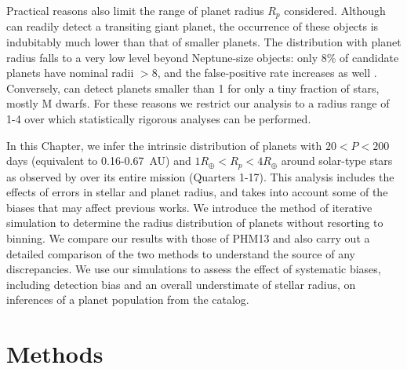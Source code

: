 Practical reasons also limit the range of planet radius $R_p$
considered.  Although \kep{} can readily detect a transiting giant
planet, the occurrence of these objects is indubitably much lower than
that of smaller planets.  The distribution with planet radius falls to
a very low level beyond Neptune-size objects: only 8\% of \kep{}
candidate planets have nominal radii $>8$\rearth{}, and the
false-positive rate increases as well \citep{Santerne2012,Colon2012}.
Conversely, \kep{} can detect planets smaller than 1\rearth{} for only
a tiny fraction of stars, mostly M dwarfs.  For these reasons we
restrict our analysis to a radius range of 1-4\rearth{} over which
statistically rigorous analyses can be performed. 

In this Chapter, we infer the intrinsic distribution of planets
with $20<P<200$ days (equivalent to 0.16-0.67~AU) and
$1 R_\oplus < R_p < 4R_\oplus$ around solar-type stars as
observed by \kep{} over
its entire mission (Quarters 1-17).  This analysis includes the
effects of errors in stellar and planet radius, and takes into account
some of the biases that may affect previous works.  We introduce the
method of iterative simulation to determine the radius distribution of
planets without resorting to binning.  We compare our results with
those of PHM13 and also carry out a detailed comparison of the two
methods to understand the source of any discrepancies.  We use our
simulations to assess the effect of systematic biases, including
detection bias and an overall understimate of stellar radius, on
inferences of a planet population from the \kep{} catalog.

\section{Methods}
\label{sec:methods}

